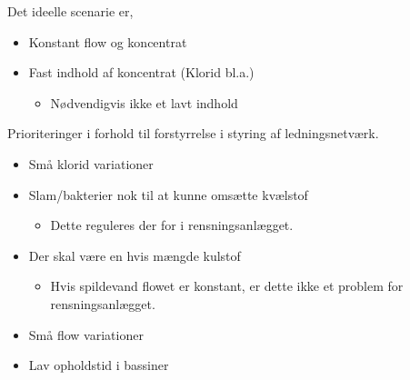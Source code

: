 Det ideelle scenarie er, 
\begin{itemize}
		\item Konstant flow og koncentrat
		\item Fast indhold af koncentrat (Klorid bl.a.)
		\begin{itemize}
			\item Nødvendigvis ikke et lavt indhold
		\end{itemize}
\end{itemize}	
Prioriteringer i forhold til forstyrrelse i styring af ledningsnetværk. 
\begin{itemize}
	\item Små klorid variationer
	\item Slam/bakterier nok til at kunne omsætte kvælstof
	\begin{itemize}
		\item Dette reguleres der for i rensningsanlægget. 
	\end{itemize}
	\item Der skal være en hvis mængde kulstof
	\begin{itemize}
		\item Hvis spildevand flowet er konstant, er dette ikke et problem for rensningsanlægget.
	\end{itemize}
	\item Små flow variationer
	\item Lav opholdstid i bassiner
\end{itemize}

